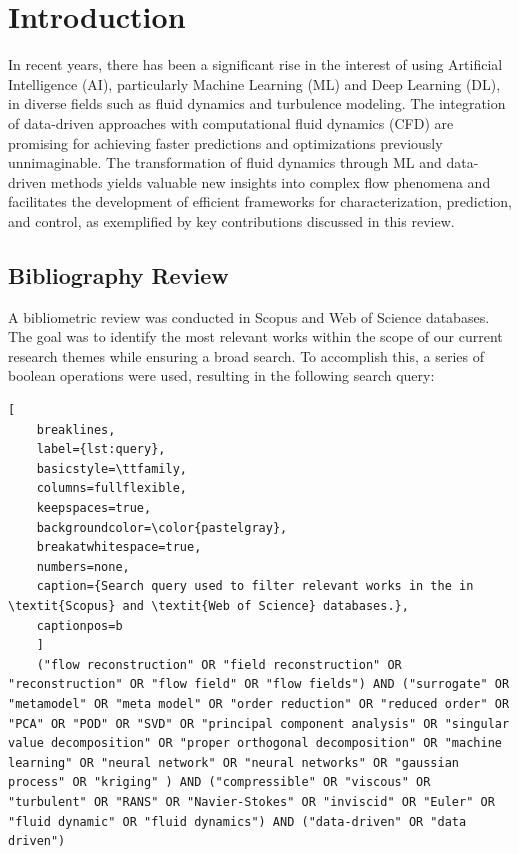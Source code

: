 

\chapter{Introduction}
\label{chap:introduction}

In recent years, there has been a significant rise in the interest of using Artificial Intelligence (AI), particularly Machine Learning (ML) and Deep Learning (DL), in diverse fields such as fluid dynamics and turbulence modeling. The integration of data-driven approaches with computational fluid dynamics (CFD) are promising for achieving faster predictions and optimizations previously unnimaginable. The transformation of fluid dynamics through ML and data-driven methods yields valuable new insights into complex flow phenomena and facilitates the development of efficient frameworks for characterization, prediction, and control, as exemplified by key contributions discussed in this review.

\section{Bibliography Review}

A bibliometric review was conducted in Scopus and Web of Science databases. The goal was to identify the most relevant works within the scope of our current research themes while ensuring a broad search. To accomplish this, a series of boolean operations were used, resulting in the following search query:

\begin{lstlisting}[
    breaklines, 
    label={lst:query},
    basicstyle=\ttfamily, 
    columns=fullflexible, 
    keepspaces=true,
    backgroundcolor=\color{pastelgray}, 
    breakatwhitespace=true, 
    numbers=none,
    caption={Search query used to filter relevant works in the in \textit{Scopus} and \textit{Web of Science} databases.},
    captionpos=b
    ]
    ("flow reconstruction" OR "field reconstruction" OR "reconstruction" OR "flow field" OR "flow fields") AND ("surrogate" OR "metamodel" OR "meta model" OR "order reduction" OR "reduced order" OR "PCA" OR "POD" OR "SVD" OR "principal component analysis" OR "singular value decomposition" OR "proper orthogonal decomposition" OR "machine learning" OR "neural network" OR "neural networks" OR "gaussian process" OR "kriging" ) AND ("compressible" OR "viscous" OR "turbulent" OR "RANS" OR "Navier-Stokes" OR "inviscid" OR "Euler" OR "fluid dynamic" OR "fluid dynamics") AND ("data-driven" OR "data driven")    
\end{lstlisting} 

